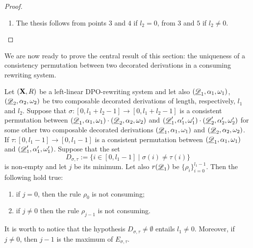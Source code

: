 \begin{proof}
\begin{enumerate}
			\item  The thesis follows from points $3$ and $4$ if $l_2=0$, from $3$ and $5$ if $l_2\neq 0$.	\qedhere
	\end{enumerate}
\end{proof}

We are now ready to prove the central result of this section: the uniqueness of a consistency permutation between two decorated derivations in a consuming rewriting system.
 
\begin{lemma}\label{lem:impo}
	Let $(\textbf {\textup{X}},R)$ be a left-linear DPO-rewriting system and let also $(\underline{\mathscr{D}}_1, \alpha_1, \omega_1)$, $(\underline{\mathscr{D}}_2, \alpha_2, \omega_2)$ be two composable decorated derivations of length, respectively, $l_1$ and $l_2$. Suppose that $\sigma:[0, l_1+l_2-1]\to [0, l_1+l_2-1]$ is a consistent permutation between $(\underline{\mathscr{D}}_1, \alpha_1, \omega_1)\cdot (\underline{\mathscr{D}}_2, \alpha_2, \omega_2)$ and $(\underline{\mathscr{D}}'_1, \alpha'_1, \omega'_1)\cdot (\underline{\mathscr{D}}'_2, \alpha'_2, \omega'_2)$ for some other two composable decorated derivations $(\underline{\mathscr{D}}_1, \alpha_1, \omega_1)$ and $(\underline{\mathscr{D}}_2, \alpha_2, \omega_2)$.  If $\tau:[0,l_1-1]\to [0, l_1-1]$ is a consistent permutation between $(\underline{\mathscr{D}}_1, \alpha_1, \omega_1)$ and $(\underline{\mathscr{D}}'_1, \alpha'_1, \omega'_1)$. Suppose that  the set 
	\[D_{\sigma, \tau}:=\{i\in [0, l_1-1]\mid \sigma(i)\neq \tau(i)\}\]
	is non-empty and let $j$ be its minimum. Let also $r(\underline{\mathscr{D}}_1)$ be $\{\rho_i\}_{i=0}^{l_1-1}$. Then the following hold true:
	\begin{enumerate}
		\item if $j=0$, then the rule $\rho_0$ is not consuming;
		\item if $j\neq 0$ then the rule $\rho_{j-1}$ is not consuming.
	\end{enumerate}
\end{lemma}
\begin{remark}\label{rem:minmax}It is worth to notice that the hypothesis $D_{\sigma, \tau} \neq \emptyset$ entails $l_1\neq 0$. Moreover, if $j\neq 0$, then $j-1$ is the maximum of $E_{\sigma, \tau}$.
\end{remark}
